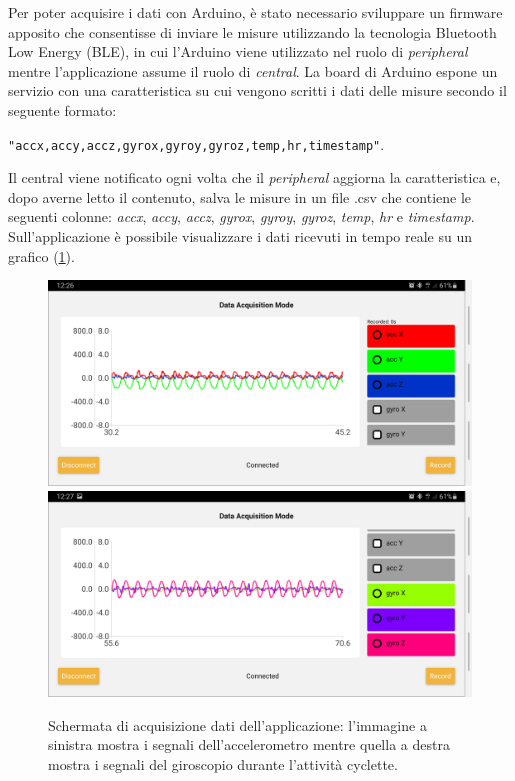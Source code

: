 \noindent
Per poter acquisire i dati con Arduino, è stato necessario sviluppare un firmware apposito che consentisse di inviare le misure utilizzando la tecnologia Bluetooth Low Energy (BLE), in cui l'Arduino viene utilizzato nel ruolo di \textit{peripheral} mentre l'applicazione assume il ruolo di \textit{central}. La board di Arduino espone un servizio con una caratteristica su cui vengono scritti i dati delle misure secondo il seguente formato: \\
\centerline{\texttt{"accx,accy,accz,gyrox,gyroy,gyroz,temp,hr,timestamp"}.}
Il central viene notificato ogni volta che il \textit{peripheral} aggiorna la caratteristica e, dopo averne letto il contenuto, salva le misure in un file .csv che contiene le seguenti colonne: \textit{accx}, \textit{accy}, \textit{accz}, \textit{gyrox}, \textit{gyroy}, \textit{gyroz}, \textit{temp}, \textit{hr} e \textit{timestamp}. Sull'applicazione è possibile visualizzare i dati ricevuti in tempo reale su un grafico (\Fig\ref{fig:schermata_acq}).
\begin{figure}[b!]
	\centering
	\includegraphics[width=0.49\linewidth]{./ImageFiles/acquisition_acc.jpg}
	\includegraphics[width=0.49\linewidth]{./ImageFiles/acquisition_gyro.jpg}
	\caption{Schermata di acquisizione dati dell'applicazione: l'immagine a sinistra mostra i segnali dell'accelerometro mentre quella a destra mostra i segnali del giroscopio durante l'attività cyclette.}
	\label{fig:schermata_acq}
\end{figure}
